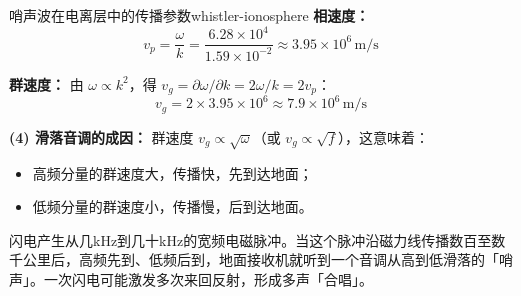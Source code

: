 \begin{example}{哨声波在电离层中的传播参数}{whistler-ionosphere}
\textbf{相速度：}
\[
v_p = \frac{\omega}{k} = \frac{6.28\times 10^4}{1.59\times 10^{-2}} \approx 3.95\times 10^6\,\mathrm{m/s}
\]

\textbf{群速度：} 由 $\omega \propto k^2$，得 $v_g = \partial\omega/\partial k = 2\omega/k = 2v_p$：
\[
v_g = 2\times 3.95\times 10^6 \approx 7.9\times 10^6\,\mathrm{m/s}
\]

\textbf{(4) 滑落音调的成因：}
群速度 $v_g \propto \sqrt{\omega}$（或 $v_g \propto \sqrt{f}$），这意味着：
\begin{itemize}[leftmargin=*,itemsep=0pt]
\item 高频分量的群速度大，传播快，先到达地面；
\item 低频分量的群速度小，传播慢，后到达地面。
\end{itemize}
闪电产生从几kHz到几十kHz的宽频电磁脉冲。当这个脉冲沿磁力线传播数百至数千公里后，高频先到、低频后到，地面接收机就听到一个音调从高到低滑落的「哨声」。一次闪电可能激发多次来回反射，形成多声「合唱」。
\end{example}

